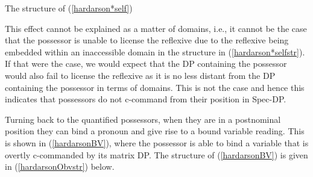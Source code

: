 \documentclass[output=paper,colorlinks,citecolor=brown,
]{langscibook}
\begin{document}
\begin{exe}
	\ex	\label{hardarsonunbound} 
		\begin{xlist}
			\label{hardarson*self}
		\end{xlist}
\end{exe}\vspace{-10pt}

\begin{exe}
	\ex	The structure of (\ref{hardarson*self})\label{hardarson*selfstr}\\
\end{exe}

\noindent This effect cannot be explained as a matter of domains, i.e., it cannot be the case that the possessor is unable to license the reflexive due to the reflexive being embedded within an inaccessible domain in the structure in (\ref{hardarson*selfstr}). If that were the case, we would expect that the DP containing the possessor would also fail to license the reflexive as it is no less distant from the DP containing the possessor in terms of domains. This is not the case and hence this indicates that possessors do not c-command from their position in Spec-DP.

Turning back to the quantified possessors, when they are in a postnominal position they can bind a pronoun and give rise to a bound variable reading. This is shown in (\ref{hardarsonBV}), where the possessor is able to bind a variable that is overtly c-commanded by its matrix DP. The structure of (\ref{hardarsonBV}) is given in (\ref{hardarsonObvstr}) below.
\end{document}
